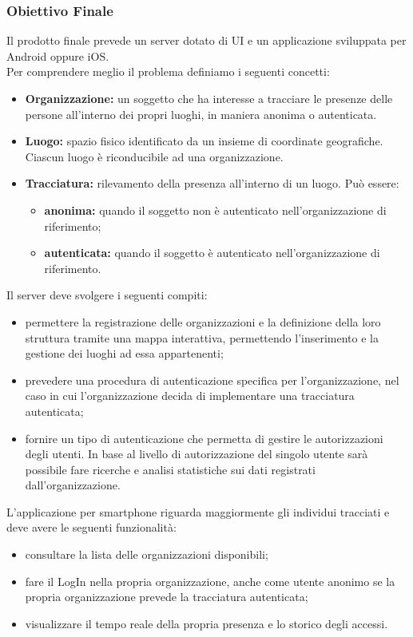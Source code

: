 	\subsubsection{Obiettivo Finale}
	Il prodotto finale prevede un server dotato di UI e un applicazione sviluppata per Android oppure iOS.\\
	Per comprendere meglio il problema definiamo i seguenti concetti:
	\begin{itemize}
		\item \textbf{Organizzazione:} un soggetto che ha interesse a tracciare le presenze delle persone all'interno dei propri luoghi, in maniera anonima o autenticata.
		\item \textbf{Luogo:} spazio fisico identificato da un insieme di coordinate geografiche. Ciascun luogo è riconducibile ad una organizzazione. 
		\item \textbf{Tracciatura:}  rilevamento della presenza all'interno di un luogo. Può essere:
		\begin{itemize}
			\item \textbf{anonima:} quando il soggetto non è autenticato nell'organizzazione di riferimento;
			\item \textbf{autenticata:} quando il soggetto è autenticato nell'organizzazione di riferimento.
		\end{itemize}
	\end{itemize}
	Il server deve svolgere i seguenti compiti:
	\begin{itemize}
		\item permettere la registrazione delle organizzazioni e la definizione della loro struttura tramite una mappa interattiva, permettendo l'inserimento e la gestione dei luoghi ad essa appartenenti; 
		\item prevedere una procedura di autenticazione specifica per l'organizzazione, nel caso in cui l'organizzazione decida di implementare una tracciatura autenticata;
		\item fornire un tipo di autenticazione che permetta di gestire le autorizzazioni degli utenti. In base al livello di autorizzazione del singolo utente sarà possibile fare ricerche e analisi statistiche sui dati registrati dall'organizzazione.
	\end{itemize}
	L'applicazione per smartphone riguarda maggiormente gli individui tracciati e deve avere le seguenti funzionalità:
	\begin{itemize}
		\item consultare la lista delle organizzazioni disponibili; 
		\item fare il LogIn nella propria organizzazione, anche come utente anonimo se la propria organizzazione prevede la tracciatura autenticata; 
		\item visualizzare il tempo reale della propria presenza e lo storico degli accessi.
	\end{itemize}
